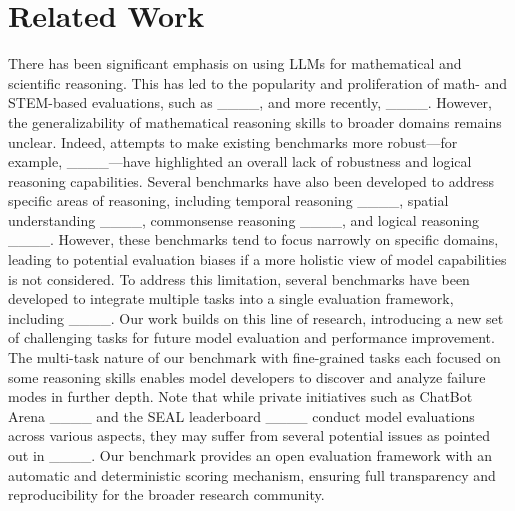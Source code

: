\section{Related Work}
There has been significant emphasis on using LLMs for mathematical and scientific reasoning. This has led to the popularity and proliferation of math- and STEM-based evaluations, such as ____, and more recently, ____. However, the generalizability of mathematical reasoning skills to broader domains remains unclear. Indeed, attempts to make existing benchmarks more robust—for example, ____—have highlighted an overall lack of robustness and logical reasoning capabilities. Several benchmarks have also been developed to address specific areas of reasoning, including temporal reasoning ____, spatial understanding ____, commonsense reasoning ____, and logical reasoning ____. However, these benchmarks tend to focus narrowly on specific domains, leading to potential evaluation biases if a more holistic view of model capabilities is not considered. To address this limitation, several benchmarks have been developed to integrate multiple tasks into a single evaluation framework, including ____. Our work builds on this line of research, introducing a new set of challenging tasks for future model evaluation and performance improvement. The multi-task nature of our benchmark with fine-grained tasks each focused on some reasoning skills enables model developers to discover and analyze failure modes in further depth.
Note that while private initiatives such as ChatBot Arena ____ and the SEAL leaderboard ____ conduct model evaluations across various aspects, they may suffer from several potential issues as pointed out in ____. Our benchmark provides an open evaluation framework with an automatic and deterministic scoring mechanism, ensuring full transparency and reproducibility for the broader research community.